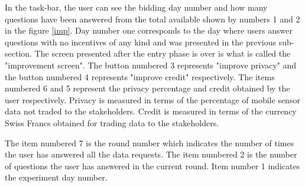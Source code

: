 In the task-bar, the user can see the bidding day number and how many questions have been answered from the total available shown by numbers 1 and 2 in the figure \ref{imp}. Day number one
corresponds to the day where users answer questions with no incentives of any kind and was presented in the previous sub-section. The screen presented after the entry phase is over is what is called the "improvement screen". 
The button numbered 3
represents "improve privacy" and the button numbered 4 represents "improve credit" respectively. The items numbered 6 and 5 represent the privacy percentage and credit obtained by the user respectively. Privacy is measured in terms of the percentage of mobile sensor data not traded to the stakeholders. Credit is measured in terms of the currency Swiss Francs obtained for trading data to the stakeholders. 

The item numbered 7 is the round number which indicates the number of times the user has answered all the data requests. The item numbered 2 is the number of questions the user has answered in the current round. Item number 1 indicates the experiment day number.



